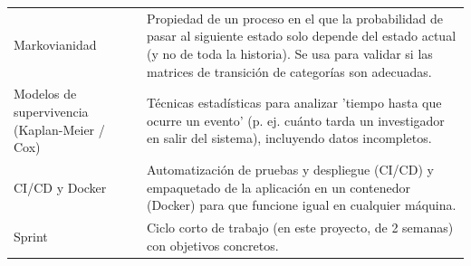 \begin{longtable}{>{\raggedright\arraybackslash}p{4.3cm}>{\raggedright\arraybackslash}p{9.8cm}}
    Markovianidad & Propiedad de un proceso en el que la probabilidad de pasar al siguiente estado solo depende del estado actual (y no de toda la historia). Se usa para validar si las matrices de transición de categorías son adecuadas.
 \\
    Modelos de supervivencia (Kaplan-Meier / Cox) & Técnicas estadísticas para analizar 'tiempo hasta que ocurre un evento' (p. ej. cuánto tarda un investigador en salir del sistema), incluyendo datos incompletos.
 \\
    CI/CD y Docker & Automatización de pruebas y despliegue (CI/CD) y empaquetado de la aplicación en un contenedor (Docker) para que funcione igual en cualquier máquina.
 \\
    Sprint & Ciclo corto de trabajo (en este proyecto, de 2 semanas) con objetivos concretos.
 \\
\bottomrule
\end{longtable}
\endgroup

